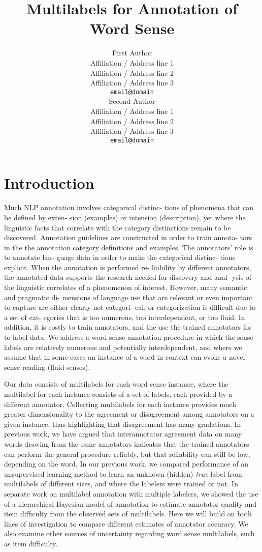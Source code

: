 \documentclass[11pt]{article}
\title{Multilabels for Annotation of Word Sense}
\author{First Author \\
   Affiliation / Address line 1 \\
   Affiliation / Address line 2 \\
   Affiliation / Address line 3 \\
  {\tt email@domain} \\\And
   Second Author \\
   Affiliation / Address line 1 \\
   Affiliation / Address line 2 \\
   Affiliation / Address line 3 \\
   {\tt email@domain} 
\\}
\date{}
\begin{document}
\maketitle
\begin{abstract}

\end{abstract}

\section{Introduction} %


Much NLP annotation involves categorical distinc- tions of phenomena
that can be defined by exten- sion (examples) or intension
(description), yet where the linguistic facts that correlate with the
category distinctions remain to be discovered. Annotation guidelines
are constructed in order to train annota- tors in the the annotation
category definitions and examples. The annotators’ role is to annotate
lan- guage data in order to make the categorical distinc- tions
explicit. When the annotation is performed re- liability by different
annotators, the annotated data supports the research needed for
discovery and anal- ysis of the linguistic correlates of a phenomenon
of interest. However, many semantic and pragmatic di- mensions of
language use that are relevant or even important to capture are either
clearly not categori- cal, or categorization is difficult due to a set
of cat- egories that is too numerous, too interdependent, or too
fluid. In addition, it is costly to train annotators, and the use the
trained annotators for to label data. We address a word sense
annotation procedure in which the sense labels are relatively numerous
and potentially interdependent, and where we assume that in some cases
an instance of a word in context can evoke a novel sense reading
(fluid senses).

Our data consists of multilabels for each word sense instance, where
the multilabel for each instance consists of a set of labels, each
provided by a different annotator. Collecting multilabels for each
instance provides much greater dimensionality to the agreement or
disagreement among annotators on a given instance, thus highlighting
that disagreement has many gradations. In previous work, we have
argued that interannotator agreement data on many words drawing from
the same annotators indicates that the trained annotators can perform
the general procedure reliably, but that reliability can still be low,
depending on the word. In our previous work, we compared performance
of an unsupervised learning method to learn an unknown (hidden) {\it
true} label from multilabels of different sizes, and where the
labelers were trained or not. In separate work on multilabel
annotation with multiple labelers, we showed the use of a hierarchical
Bayesian model of annotation to estimate annotator quality and item
difficulty from the observed sets of multilabels. Here we will build
on both lines of investigation to compare different estimates of
annotator accuracy. We also examine other sources of uncertainty
regarding word sense multilabels, such as item difficulty.
\end{document}
